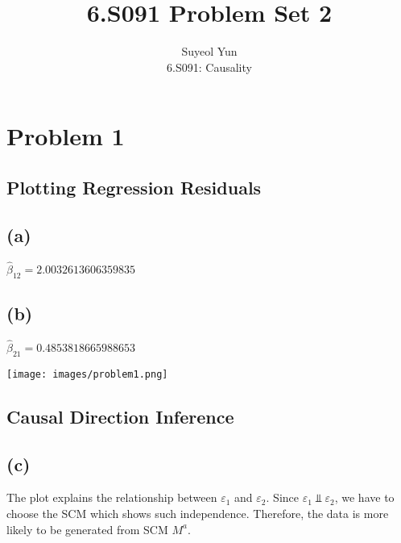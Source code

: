 \documentclass[10pt]{article}
\begin{document}
 
\title{6.S091 Problem Set 2}
\author{Suyeol Yun\\
6.S091: Causality}
\maketitle
 
\section{Problem 1}
\subsection{Plotting Regression Residuals}
\subsection{(a)} $\hat{\beta}_{12} = 2.0032613606359835$
\subsection{(b)} $\hat{\beta}_{21} = 0.4853818665988653$

\texttt{[image: images/problem1.png]}

\subsection{Causal Direction Inference}

\subsection{(c)}
The plot explains the relationship between $\varepsilon_1$ and $\varepsilon_2$. Since $\varepsilon_1 \Perp \varepsilon_2$, we have to choose the SCM which shows such independence. Therefore, the data is more likely to be generated from SCM $M^a$.
\end{document}
